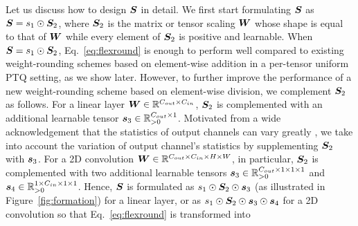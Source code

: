 \documentclass{article}
\theoremstyle{plain}
\theoremstyle{definition}
\theoremstyle{remark}
\begin{document}
Let us discuss how to design ${\bm{S}}$ in detail. We first start formulating ${\bm{S}}$ as ${\bm{S}} = s_1 \odot {\bm{S}}_2$, where ${\bm{S}}_2$ is the matrix or tensor scaling ${\bm{W}}$ whose shape is equal to that of ${\bm{W}}$ while every element of ${\bm{S}}_2$ is positive and learnable. When ${\bm{S}} = s_1 \odot {\bm{S}}_2$, Eq.~\ref{eq:flexround} is enough to perform well compared to existing weight-rounding schemes based on element-wise addition in a per-tensor uniform PTQ setting, as we show later. However, to further improve the performance of a new weight-rounding scheme based on element-wise division, %
we complement ${\bm{S}}_2$ as follows. For a linear layer ${\bm{W}} \in \mathbb{R}^{C_{out} \times C_{in}}$, ${\bm{S}}_2$ is complemented with an additional learnable tensor ${\bm{s}}_3 \in \mathbb{R}_{> 0}^{C_{out} \times 1}$. Motivated from a wide acknowledgement that the statistics of output channels can vary greatly \citep{nagel2019data, lou2020autoq}, we take into account the variation of output channel's statistics by supplementing ${\bm{S}}_2$ with ${\bm{s}}_3$. 
For a 2D convolution ${\bm{W}} \in \mathbb{R}^{C_{out} \times C_{in} \times H \times W}$, in particular, ${\bm{S}}_2$ is complemented with two additional learnable tensors ${\bm{s}}_3 \in \mathbb{R}_{> 0}^{C_{out} \times 1 \times 1 \times 1}$ and ${\bm{s}}_4 \in \mathbb{R}_{> 0}^{1 \times C_{in} \times 1 \times 1}$. Hence, ${\bm{S}}$ is formulated as $s_1 \odot {\bm{S}}_2 \odot {\bm{s}}_3$ (as illustrated in Figure~\ref{fig:formation}) for a linear layer, or as $s_1 \odot {\bm{S}}_2 \odot {\bm{s}}_3 \odot {\bm{s}}_4$ for a 2D convolution so that Eq.~\ref{eq:flexround} is transformed into
\end{document}
